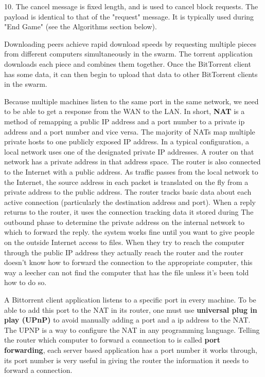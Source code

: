 \documentclass[11pt]{article}
\begin{document}
  \begin{flushleft}

    10. The cancel message is fixed length, and is used to cancel block requests. The payload is identical to that of the "request" message. It is typically used during "End Game" (see the Algorithms section below).

  \end{flushleft}
  \begin{flushleft}

    Downloading peers achieve rapid download speeds by requesting multiple pieces from different computers simultaneously in the swarm.
    The torrent application downloads each piece and combines them together. Once the BitTorrent client has some data, it can then begin to upload that data to other BitTorrent clients in the swarm.

  \end{flushleft}
  \begin{flushleft}
  \end{flushleft}
  \begin{flushleft}

    Because multiple machines listen to the same port in the same network, we need to be able to get a response from the WAN to the LAN. In short, \textbf{NAT} is a method of remapping a public IP address and a port number to a private ip address and a port number and vice versa. The majority of NATs map multiple private hosts to one publicly exposed IP address. In a typical configuration, a local network uses one of the designated private IP addresses. A router on that network has a private address in that address space. The router is also connected to the Internet with a public address. As traffic passes from the local network to the Internet, the source address in each packet is translated on the fly from a private address to the public address. The router tracks basic data about each active connection (particularly the destination address and port). When a reply returns to the router, it uses the connection tracking data it stored during The outbound phase to determine the private address on the internal network to which to forward the reply. the system works fine until you want to give people on the outside Internet access to files. When they try to reach the computer through the public IP address they actually reach the router and the router doesn't know how to forward the connection to the appropriate computer, this way a leecher can not find the computer that has the file unless it's been told how to do so.

    A Bittorrent client application listens to a specific port in every machine. To be able to add this port to the NAT in its router, one must use \textbf{universal plug in play (UPnP)} to avoid manually adding a port and a ip address to the NAT. The UPNP is a way to configure the NAT in any programming language. Telling the router which computer to forward a connection to is called \textbf{port forwarding}, each server based application has a port number it works through, its port number is very useful in giving the router the information it needs to forward a connection.

  \end{flushleft}
\end{document}
